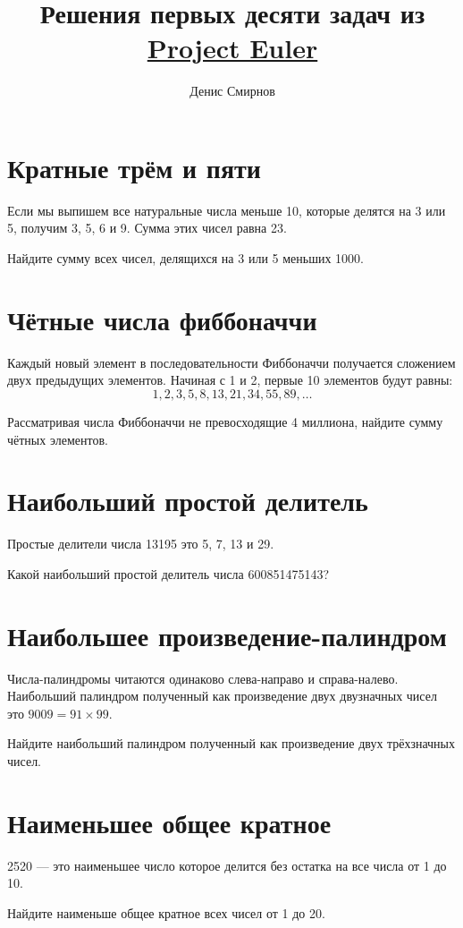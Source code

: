 \documentclass[11pt,a4paper]{article}
\title{Решения первых десяти задач из \href{https://projecteuler.net/index.php?section=problems}{Project Euler}}
\author{Денис Смирнов}
\date{}
\newcommand{\pycode}[1]{}
\newenvironment{task}[2]
{\section{#1}
\newcommand{\printcode}{\pycode{#2}}
}
{\printcode
}
\begin{document}
\maketitle
\tableofcontents
\clearpage

\begin{task}{Кратные трём и пяти}{001-multiples-3-and-5.py}
    Если мы выпишем все натуральные числа меньше 10, которые делятся на 3 или 5, получим 3, 5, 6 и 9.
    Сумма этих чисел равна 23.

    Найдите сумму всех чисел, делящихся на 3 или 5 меньших 1000.
\end{task}

\begin{task}{Чётные числа фиббоначчи}{002-even-fibbonacci-numbers.py}
    Каждый новый элемент в последовательности Фиббоначчи получается сложением двух предыдущих элементов.
    Начиная с 1 и 2, первые 10 элементов будут равны:
    \begin{equation*}
        1, 2, 3, 5, 8, 13, 21, 34, 55, 89, \dots
    \end{equation*}

    Рассматривая числа Фиббоначчи не превосходящие 4 миллиона, найдите сумму чётных элементов.
\end{task}

\begin{task}{Наибольший простой делитель}{003-largest-prime-factor.py}
    Простые делители числа 13195 это 5, 7, 13 и 29.
        
    Какой наибольший простой делитель числа 600851475143?
\end{task}

\begin{task}{Наибольшее произведение-палиндром}{004-largest-palindrome-product.py}
    Числа-палиндромы читаются одинаково слева-направо и справа-налево.
    Наибольший палиндром полученный как произведение двух двузначных чисел это $9009 = 91 \times 99$.

    Найдите наибольший палиндром полученный как произведение двух трёхзначных чисел.
\end{task}

\begin{task}{Наименьшее общее кратное}{005-smallest-multiple.py}
    2520 --- это наименьшее число которое делится без остатка на все числа от 1 до 10.

    Найдите наименьше общее кратное всех чисел от 1 до 20.
\end{task}
\end{document}
